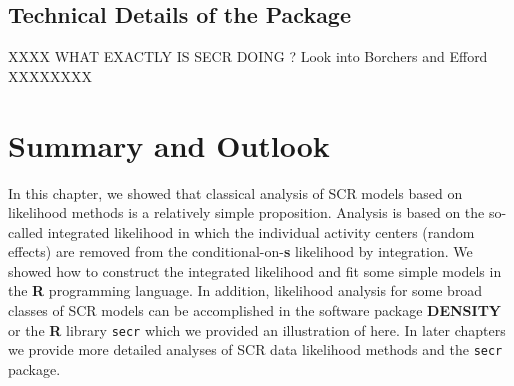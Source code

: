\begin{comment}
As an
exercise, run this analysis for 30 and 40 km buffers and compare those
found in section 4.6 under {\bf WinBUGS}.  
NOTE: The function \mbox{\tt
  secr.fit} 
will return a
warning when the buffer size appears to be too small.  This is useful
particularly with the different units being used between programs and
packages.
\end{comment}

\subsection{Technical Details of the \secr Package}

XXXX WHAT EXACTLY IS SECR DOING ? Look into Borchers and Efford
XXXXXXXX


\begin{comment}
\subsection{Analysis of Efford's Possum Data}

Demonstrates an explicit model misspecification.
Or maybe -- likelihood easy to apply to multinomial likelihood from
prev chapter which is probably what secr does (checking with efford)

Use the mask he provides (show picture)
Use rectangular mask.

Cite above material on state-space grid. Use our likelihood function
with his state-space grid.

Need to focus on a specific illustration here. I think using
secr to fit the basic model using the state-space grid or no
state-space
grid, and using our likelihood function, would be fine.
Thats 4 estimates. 

Secr + grid
secr + no grid -- really a fine grid I think 
my likelihood + secr grid
my likelihood + really fine grid

Note: should not compare AIC across analysis platforms because the
likelihoods can be scaled arbitrarily -- depending on what to leave in
or leave out.
\end{comment}


\section{Summary and Outlook}

In this chapter, we showed that classical analysis of SCR models based
on likelihood methods is a relatively simple proposition.  Analysis is
based on the so-called integrated likelihood in which the individual
activity centers (random effects) are removed from the
conditional-on-{\bf s} likelihood by integration. We showed how to construct
the integrated likelihood and fit some simple models in the {\bf R}
programming language.  In addition, likelihood analysis for some broad
classes of SCR models can be accomplished in the software package
{\bf DENSITY} 
or the {\bf R}
library \mbox{\tt secr} which we provided an illustration of here. In later
chapters we provide more detailed analyses of SCR data likelihood
methods and the
\mbox{\tt secr}
package.

